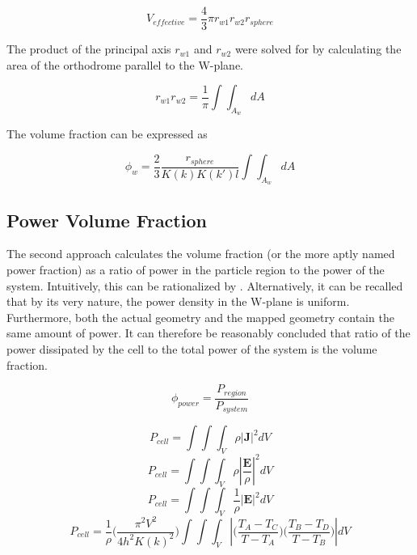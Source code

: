 \begin{equation}
    V_{effective} = \frac{4}{3}\pi r_{w1}r_{w2}r_{sphere}
\end{equation}

\noindent The product of the principal axis $r_{w1}$ and $r_{w2}$ were solved for by calculating the area of the orthodrome parallel to the W-plane.

\begin{equation}
    r_{w1}r_{w2} = \frac{1}{\pi}\int\int_{A_w} dA
\end{equation}

\par The volume fraction can be expressed as

\begin{equation}
    \phi_w = \frac{2}{3} \frac{r_{sphere}}{K(k)K(k')l} \int\int_{A_w} dA
\end{equation}

\subsection*{Power Volume Fraction}
\par The second approach calculates the volume fraction (or the more aptly named power fraction) as a ratio of power in the particle region to the power of the system. Intuitively, this can be rationalized by . Alternatively, it can be recalled that by its very nature, the power density in the W-plane is uniform. Furthermore, both the actual geometry and the mapped geometry contain the same amount of power. It can therefore be reasonably concluded that ratio of the power dissipated by the cell to the total power of the system is the volume fraction.

\begin{equation}
    \phi_{power} = \frac{P_{region}}{P_{system}}
\end{equation}

\begin{equation}
    P_{cell} = \int\int\int_V \rho |\boldsymbol{J}|^2 dV
\end{equation}
\begin{equation}
    P_{cell} = \int\int\int_V \rho |\frac{\boldsymbol{E}}{\rho}|^2 dV
\end{equation}
\begin{equation}
    P_{cell} = \int\int\int_V \frac{1}{\rho} |\boldsymbol{E}|^2 dV
\end{equation}
\begin{equation}
    P_{cell} = \frac{1}{\rho}\bigg(\frac{\pi^2V^2}{4h^2K(k)^2}\bigg)\int\int\int_V |\Big(\frac{T_A-T_C}{T-T_A}\Big)\Big(\frac{T_B-T_D}{T-T_B}\Big)| dV
\end{equation}

